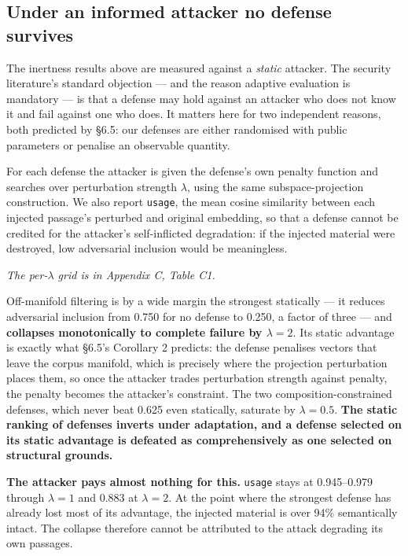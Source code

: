 \documentclass[authoryear,review,3p,times]{elsarticle}
\begin{document}
\subsection{Under an informed attacker no defense survives}\label{adaptive-attacker-no-defense-survives-an-informed-adversary}

The inertness results above are measured against a \emph{static} attacker. The security literature's standard objection --- and the reason adaptive evaluation is mandatory --- is that a defense may hold against an attacker who does not know it and fail against one who does. It matters here for two independent reasons, both predicted by §6.5: our defenses are either randomised with public parameters or penalise an observable quantity.

For each defense the attacker is given the defense's own penalty function and searches over perturbation strength \(\lambda\), using the same subspace-projection construction. We also report \texttt{usage}, the mean cosine similarity between each injected passage's perturbed and original embedding, so that a defense cannot be credited for the attacker's self-inflicted degradation: if the injected material were destroyed, low adversarial inclusion would be meaningless.

\emph{The per-\(\lambda\) grid is in Appendix C, Table C1.}

Off-manifold filtering is by a wide margin the strongest statically --- it reduces adversarial inclusion from 0.750 for no defense to 0.250, a factor of three --- and \textbf{collapses monotonically to complete failure by \(\lambda = 2\)}. Its static advantage is exactly what §6.5's Corollary 2 predicts: the defense penalises vectors that leave the corpus manifold, which is precisely where the projection perturbation places them, so once the attacker trades perturbation strength against penalty, the penalty becomes the attacker's constraint. The two composition-constrained defenses, which never beat 0.625 even statically, saturate by \(\lambda = 0.5\). \textbf{The static ranking of defenses inverts under adaptation, and a defense selected on its static advantage is defeated as comprehensively as one selected on structural grounds.}

\textbf{The attacker pays almost nothing for this.} \texttt{usage} stays at 0.945--0.979 through \(\lambda = 1\) and 0.883 at \(\lambda = 2\). At the point where the strongest defense has already lost most of its advantage, the injected material is over 94\% semantically intact. The collapse therefore cannot be attributed to the attack degrading its own passages.
\end{document}
